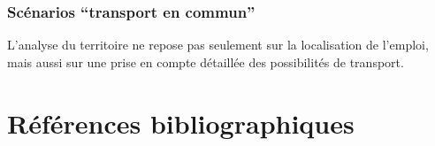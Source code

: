 \documentclass[
  10pt,
  a4paper,
  numbers=noendperiod,
  DIV=9]{scrreprt}
\begin{document}
\hypertarget{scuxe9narios-transport-en-commun}{%
\subsection{Scénarios ``transport en
commun''}\label{scuxe9narios-transport-en-commun}}

L'analyse du territoire ne repose pas seulement sur la localisation de
l'emploi, mais aussi sur une prise en compte détaillée des possibilités
de transport.


\hypertarget{ruxe9fuxe9rences-bibliographiques}{%
\chapter*{Références
bibliographiques}\label{ruxe9fuxe9rences-bibliographiques}}

\end{document}
